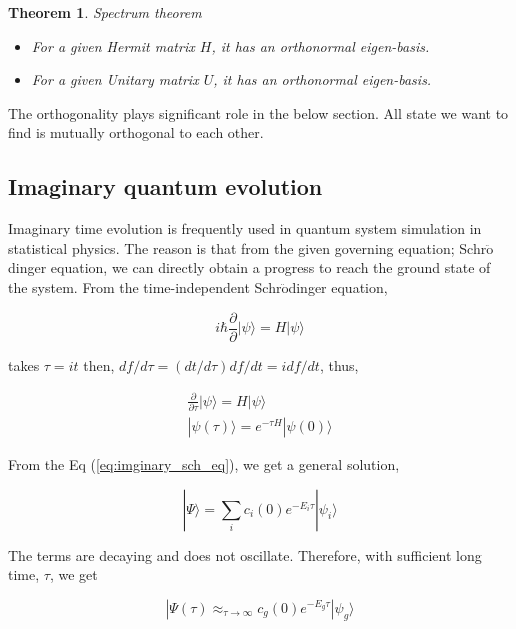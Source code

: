 \documentclass[twocolumn]{article}
\newtheorem{theorem}{Theorem}
\begin{document}
\begin{theorem}{Spectrum theorem}
    
    \begin{itemize}
        \item For a given Hermit matrix $H$, it has an orthonormal eigen-basis.
        \item For a given Unitary matrix $U$, it has an orthonormal eigen-basis.
    \end{itemize}

\end{theorem}

The orthogonality plays significant role in the below section.
All state we want to find is mutually orthogonal to each other.

\subsection{Imaginary quantum evolution}

Imaginary time evolution is frequently used in 
quantum system simulation in statistical physics. 
The reason is that from the given governing equation; Schr$\ddot{\mbox{o}}$dinger  equation,
we can directly obtain a progress to reach the ground state of the system.
From the time-independent Schr$\ddot{\mbox{o}}$dinger  equation, 

\begin{equation}
    i \hbar \frac{\partial}{\partial}| \psi \rangle = H |\psi \rangle
\end{equation}

takes $\tau = i t$  then, $df/d\tau = (dt/d\tau) df/dt = i df/dt$, thus,

\begin{align}
    \frac{\partial}{\partial \tau} | \psi \rangle = H | \psi \rangle \label{eq:imginary_sch_eq}\\
    | \psi(\tau) \rangle = e^{- \tau H} | \psi(0) \rangle
\end{align}

From the Eq (\ref{eq:imginary_sch_eq}), we get a general solution,

\begin{equation}
    |\Psi \rangle = \sum_{i} c_i(0) e^{- E_i \tau} | \psi_i \rangle
\end{equation}

The terms are decaying and does not oscillate. Therefore, with sufficient long time, $\tau$, 
we get 

\begin{equation}
    |\Psi(\tau) \approx_{\tau \rightarrow \infty} c_g(0) e^{- E_g \tau} | \psi_g \rangle
\end{equation}
\end{document}
